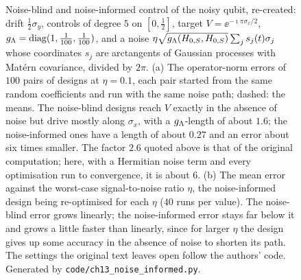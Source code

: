 \documentclass[handoutsbeamer.tex]{subfiles}
\begin{document}
\begin{frame}
{\begin{figure}[tbp]
\caption{Noise-blind and noise-informed control of the noisy qubit, re-created: drift $\tfrac12\sigma_y$, controls of degree $5$ on $[0,\tfrac12]$, target $V=\ee^{-\imath\pi\sigma_x/2}$, $g_{\Lambda}=\operatorname{diag}(1,\tfrac1{100},\tfrac1{100})$, and a noise $\eta\sqrt{g_{\Lambda}(H_{0,S},H_{0,S})}\sum_js_j(t)\sigma_j$ whose coordinates $s_j$ are arctangents of Gaussian processes with Mat\'ern covariance, divided by $2\pi$. (a) The operator-norm errors of $100$ pairs of designs at $\eta=0.1$, each pair started from the same random coefficients and run with the same noise path; dashed: the means. The noise-blind designs reach $V$ exactly in the absence of noise but drive mostly along $\sigma_x$, with a $g_{\Lambda}$-length of about $1.6$; the noise-informed ones have a length of about $0.27$ and an error about six times smaller. The factor $2.6$ quoted above is that of the original computation; here, with a Hermitian noise term and every optimisation run to convergence, it is about $6$. (b) The mean error against the worst-case signal-to-noise ratio $\eta$, the noise-informed design being re-optimised for each $\eta$ ($40$ runs per value). The noise-blind error grows linearly; the noise-informed error stays far below it and grows a little faster than linearly, since for larger $\eta$ the design gives up some accuracy in the absence of noise to shorten its path. The settings the original text leaves open follow the authors' code. Generated by \texttt{code/ch13\_noise\_informed.py}.}\label{fig:ch13:noise_informed}
\end{figure}}
\end{frame}
\end{document}
